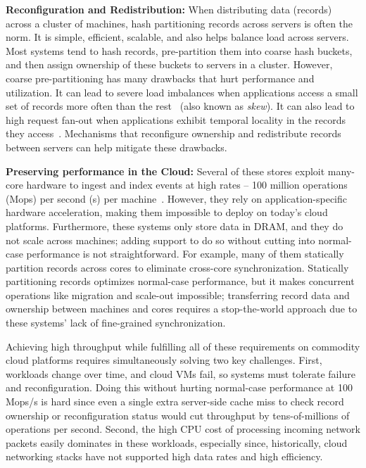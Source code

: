 \textbf{Reconfiguration and Redistribution:}
When distributing data (records) across a cluster of
machines, hash partitioning records across
servers is often the norm.
%
It is simple, efficient, scalable, and also helps balance load
across servers.
%
Most systems tend to hash records, pre-partition them into coarse hash
buckets, and then assign ownership of these buckets to servers in a
cluster.
%
However, coarse pre-partitioning has many drawbacks that hurt
performance and utilization.
%
It can lead to severe load imbalances when applications access a small
set of records more often than the rest~\cite{slicer} (also known as
\emph{skew}).
%
It can also lead to high request fan-out when
applications exhibit temporal locality in the records they
access~\cite{rocksteady}.
%
Mechanisms that reconfigure ownership and
redistribute records between servers can help mitigate these drawbacks.

%
%

\textbf{Preserving performance in the Cloud:}
Several of these stores exploit many-core hardware to
ingest and index events at high rates -- 100 million operations
(Mops) per second (s) per machine~\cite{mica,flexnic,floem,kvdirect}.
%
However, they rely on application-specific
hardware acceleration, making them impossible to deploy on today's cloud
platforms.
%
Furthermore, these systems only store data in DRAM, and they do not scale across
machines; adding support to do so without cutting into normal-case performance
is not straightforward.
%
For example, many of them statically partition records across cores to
eliminate cross-core synchronization.
%
Statically partitioning records optimizes normal-case performance, but
it makes concurrent
operations like migration and scale-out impossible; transferring record data
and ownership between machines and cores requires a stop-the-world approach
due to these systems' lack of fine-grained synchronization.

Achieving high throughput while fulfilling all of these requirements on
commodity cloud platforms requires simultaneously solving two key
challenges.
%
First, workloads change over time, and cloud VMs fail, so
systems must tolerate failure and reconfiguration.
%
Doing this without
hurting normal-case performance at 100 Mops/s is hard since even a
single extra server-side cache miss to check record ownership or
reconfiguration status would cut throughput by tens-of-millions of
operations per second.
%
Second, the high CPU cost of processing incoming
network packets easily dominates in these workloads, especially since,
historically, cloud networking stacks have not supported high data rates
and high efficiency.

